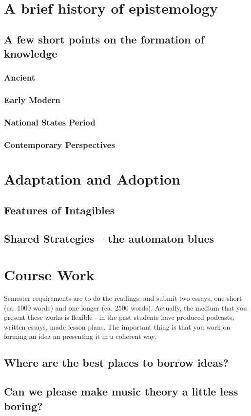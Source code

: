 \documentclass[11pt]{article}
\begin{document}
\section*{A brief history of epistemology}
\label{sec:org13a0fdd}
\subsection*{A few short points on the formation of knowledge}
\label{sec:org447032c}
\subsubsection*{Ancient}
\label{sec:org02e1e7d}
\subsubsection*{Early Modern}
\label{sec:org8dfc975}
\subsubsection*{National States Period}
\label{sec:org4c44de6}
\subsubsection*{Contemporary Perspectives}
\label{sec:org1c63721}


\section*{Adaptation and Adoption}
\label{sec:org1eb6335}
\subsection*{Features of Intagibles}
\label{sec:orgdccc025}
\subsection*{Shared Strategies – the automaton blues}
\label{sec:orgb1a82b0}


\section*{Course Work}
\label{sec:org3192dd9}
Semester requirements are to do the readings, and submit two essays,
one short (ca. 1000 words) and one longer (ca. 2500 words). Actually,
the medium that you present these works is flexible - in the past
students have produced podcasts, written essays, made lesson
plans. The important thing is that you work on forming an idea an
presenting it in a coherent way.

\subsection*{Where are the best places to borrow ideas?}
\label{sec:org3a22896}
\subsection*{Can we please make music theory a little less boring?}
\label{sec:orgfd1325c}
\end{document}
